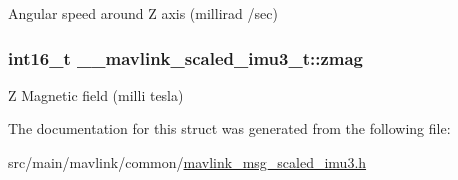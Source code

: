 Angular speed around Z axis (millirad /sec) 

\hypertarget{struct____mavlink__scaled__imu3__t_a478b7a4a81b84f588694fa30db3ee9a0}{
\subsubsection[{zmag}]{\setlength{\rightskip}{0pt plus 5cm}int16\+\_\+t \+\_\+\+\_\+mavlink\+\_\+scaled\+\_\+imu3\+\_\+t\+::zmag}}\label{struct____mavlink__scaled__imu3__t_a478b7a4a81b84f588694fa30db3ee9a0}


Z Magnetic field (milli tesla) 



The documentation for this struct was generated from the following file\+:\begin{DoxyCompactItemize}
\item 
src/main/mavlink/common/\hyperlink{mavlink__msg__scaled__imu3_8h}{mavlink\+\_\+msg\+\_\+scaled\+\_\+imu3.\+h}\end{DoxyCompactItemize}
